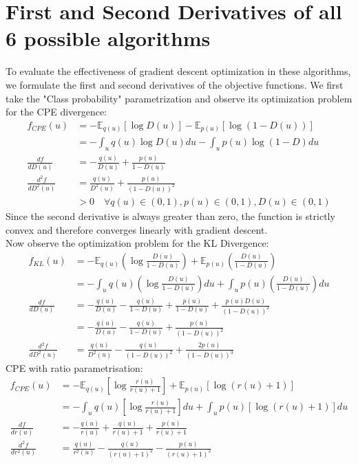 \documentclass[honours,12pt]{unswthesis}
\newcommand{\E}{\mathbb{E}}
\numberwithin{equation}{section}
\theoremstyle{definition}
\begin{document}
\section{First and Second Derivatives of all 6 possible algorithms}
To evaluate the effectiveness of gradient descent optimization in these algorithms, we formulate the first and second derivatives of the objective functions. We first take the "Class probability" parametrization and observe its optimization problem for the CPE divergence:
\begin{align*}
f_{CPE}(u)&=-\E_{q(u)}[\log D(u)]-\E_{p(u)}[\log (1-D(u))]\\
&=-\int_u q(u)\log D(u) du -\int_u p(u)\log(1-D)du\\
\frac{df}{dD(u)}&=-\frac{q(u)}{D(u)}+\frac{p(u)}{1-D(u)}\\
\frac{d^2f}{dD^2(u)}&=\frac{q(u)}{D^2(u)}+\frac{p(u)}{(1-D(u))^2}\\
&>0 \quad \forall q(u)\in(0,1), p(u)\in (0,1), D(u)\in (0,1) 
\end{align*}
Since the second derivative is always greater than zero, the function is strictly convex and therefore converges linearly with gradient descent.\\
Now observe the optimization problem for the KL Divergence:
\begin{align*}
f_{KL}(u)&=-\E_{q(u)}\left(\log \frac{D(u)}{1-D(u)}\right)+\E_{p(u)}\left(\frac{D(u)}{1-D(u)}\right)\\
&=-\int_u q(u)\left(\log \frac{D(u)}{1-D(u)}\right)du+\int_u p(u)\left(\frac{D(u)}{1-D(u)}\right)du\\
\frac{df}{dD(u)}&=-\frac{q(u)}{D(u)}-\frac{q(u)}{1-D(u)}+\frac{p(u)}{1-D(u)}+\frac{p(u)D(u)}{(1-D(u))^2}\\
&=-\frac{q(u)}{D(u)}-\frac{q(u)}{1-D(u)}+\frac{p(u)}{(1-D(u))^2}\\
\frac{d^2f}{dD^2(u)}&=\frac{q(u)}{D^2(u)}-\frac{q(u)}{(1-D(u))^2}+\frac{2p(u)}{(1-D(u))^3}
\end{align*}
CPE with ratio parametrisation:
\begin{align*}
f_{CPE}(u)&=-\E_{q(u)}\left[\log \frac{r(u)}{r(u)+1}\right]+\E_{p(u)}\left[\log(r(u)+1)\right]\\
&=-\int_u q(u)\left[\log \frac{r(u)}{r(u)+1}\right]du+\int_u p(u)\left[\log(r(u)+1)\right]du\\
\frac{df}{dr(u)}&=-\frac{q(u)}{r(u)}+\frac{q(u)}{r(u)+1}+\frac{p(u)}{r(u)+1}\\
\frac{d^2f}{dr^2(u)}&=\frac{q(u)}{r^2(u)}-\frac{q(u)}{(r(u)+1)^2}-\frac{p(u)}{(r(u)+1)^2}
\end{align*}
\end{document}

